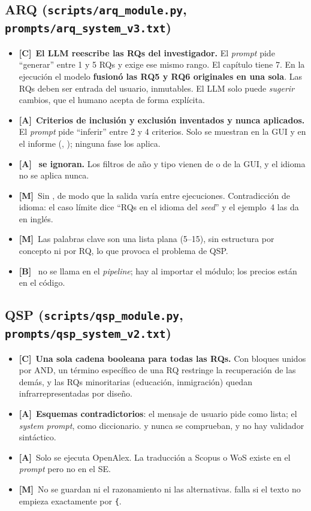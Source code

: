 \documentclass[11pt,a4paper]{article}
\newcommand{\sevC}{\textcolor{crit}{\textbf{[C]}}}
\newcommand{\sevA}{\textcolor{alto}{\textbf{[A]}}}
\newcommand{\sevM}{\textcolor{medio}{\textbf{[M]}}}
\newcommand{\sevB}{\textcolor{bajo}{\textbf{[B]}}}
\begin{document}
\subsection{ARQ (\texttt{scripts/arq\_module.py}, \texttt{prompts/arq\_system\_v3.txt})}
\begin{itemize}
  \item \sevC~\textbf{El LLM reescribe las RQs del investigador.} El \emph{prompt} pide ``generar'' entre 1 y 5 RQs y  exige ese mismo rango. El capítulo tiene 7. En la ejecución  el modelo \textbf{fusionó las RQ5 y RQ6 originales en una sola}. Las RQs deben ser entrada del usuario, inmutables. El LLM solo puede \emph{sugerir} cambios, que el humano acepta de forma explícita.
  \item \sevA~\textbf{Criterios de inclusión y exclusión inventados y nunca aplicados.} El \emph{prompt} pide ``inferir'' entre 2 y 4 criterios. Solo se muestran en la GUI y en el informe (, ); ninguna fase los aplica.
  \item \sevA~\textbf{ se ignoran.} Los filtros de año y tipo vienen de  o de la GUI, y el idioma no se aplica nunca.
  \item \sevM~Sin , de modo que la salida varía entre ejecuciones. Contradicción de idioma: el caso límite dice ``RQs en el idioma del \emph{seed}'' y el ejemplo~4 las da en inglés.
  \item \sevM~Las palabras clave son una lista plana (5--15), sin estructura por concepto ni por RQ, lo que provoca el problema de QSP.
  \item \sevB~ no se llama en el \emph{pipeline}; hay  al importar el módulo; los precios están en el código.
\end{itemize}

\subsection{QSP (\texttt{scripts/qsp\_module.py}, \texttt{prompts/qsp\_system\_v2.txt})}
\begin{itemize}
  \item \sevC~\textbf{Una sola cadena booleana para todas las RQs.} Con bloques unidos por AND, un término específico de una RQ restringe la recuperación de las demás, y las RQs minoritarias (educación, inmigración) quedan infrarrepresentadas por diseño.
  \item \sevA~\textbf{Esquemas contradictorios}: el mensaje de usuario pide  como lista; el \emph{system prompt}, como diccionario.  y  nunca se comprueban, y no hay validador sintáctico.
  \item \sevA~Solo se ejecuta OpenAlex. La traducción a Scopus o WoS existe en el \emph{prompt} pero no en el SE.
  \item \sevM~No se guardan ni el razonamiento ni las alternativas.  falla si el texto no empieza exactamente por \texttt{\{}.
\end{itemize}
\end{document}
